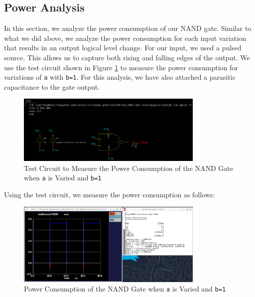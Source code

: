 \documentclass{article}
\begin{document}
	\subsection{Power Analysis}
	
	In this section, we analyze the power consumption of our NAND gate. Similar to what we did above, we analyze the power consumption for each input variation that results in an output logical level change. For our input, we used a pulsed source. This allows us to capture both rising and falling edges of the output. We use the test circuit shown in Figure \ref{fig::nand_power_test_sweep_va} to measure the power consumption for variations of \texttt{a} with \texttt{b=1}. For this analysis, we have also attached a parasitic capacitance to the gate output.
	
	\begin{figure}[H]
		\centerline{\includegraphics[width=0.8\textwidth]{nand_power_test_sweep_va.png}}
		\caption{Test Circuit to Measure the Power Consumption of the NAND Gate when \texttt{a} is Varied and \texttt{b=1}}
		\label{fig::nand_power_test_sweep_va}
	\end{figure}
	
	\noindent Using the test circuit, we measure the power consumption as follows:
	
	\begin{figure}[H]
		\centerline{\includegraphics[width=0.8\textwidth]{nand_power_sweep_va.png}}
		\caption{Power Consumption of the NAND Gate when \texttt{a} is Varied and \texttt{b=1}}
		\label{fig::nand_power_sweep_va}
	\end{figure}
	
\end{document}
